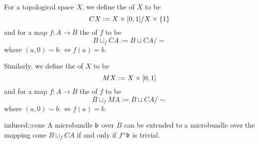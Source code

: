 
\begin{myparagraph}
    For a topological space $X$, we define the  of $X$ to be 
    \[ CX := X \times [0, 1] / X \times \{1\} \]
    and for a map $f: A \to B$ the  of $f$ to be
    \[ B \sqcup_f CA := B \sqcup CA / \sim \]
    where $(a, 0) \sim b :\iff f(a) = b$.
    
    Similarly, we define the  of $X$ to be
    \[ MX := X \times [0, 1] \]
    and for a map $f: A \to B$ the  of $f$ to be
    \[ B \sqcup_f MA := B \sqcup CA / \sim \]
    where $(a, 0) \sim b :\iff f(a) = b$.
\end{myparagraph}

\begin{mylemma}{induced::cone}
    A microbundle $\mathfrak{b}$ over $B$ can be extended to a microbundle over the mapping cone $B \sqcup_f CA$ if and only if $f^*\mathfrak{b}$ is trivial.
\end{mylemma}
